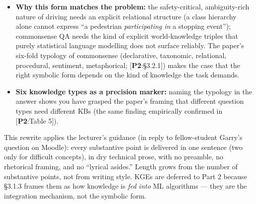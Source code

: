 \documentclass[11pt, a4paper]{article}
\newcommand{\paperref}[1]{\textcolor{srcBd}{\small[\textbf{P2}:#1]}}
\begin{document}
\begin{itemize}
  \item \textbf{Why this form matches the problem:} the safety-critical, ambiguity-rich nature of driving needs an explicit relational structure (a class hierarchy alone cannot express ``a pedestrian \emph{participating in} a stopping event''); commonsense QA needs the kind of explicit world-knowledge triples that purely statistical language modelling does not surface reliably. The paper's six-fold typology of commonsense (declarative, taxonomic, relational, procedural, sentiment, metaphorical; \paperref{§3.2.1}) makes the case that the right symbolic form depends on the kind of knowledge the task demands.
  \item \textbf{Six knowledge types as a precision marker:} naming the typology in the answer shows you have grasped the paper's framing that different question types need different KBs (the same finding empirically confirmed in \paperref{Table 5}).
\end{itemize}

\begin{notebox}
This rewrite applies the lecturer's guidance (in reply to fellow-student Garry's question on Moodle): every substantive point is delivered in one sentence (two only for difficult concepts), in dry technical prose, with no preamble, no rhetorical framing, and no ``lyrical asides.'' Length grows from the number of substantive points, not from writing style. KGEs are deferred to Part 2 because §3.1.3 frames them as how knowledge is \emph{fed into} ML algorithms — they are the integration mechanism, not the symbolic form.
\end{notebox}
\end{document}
